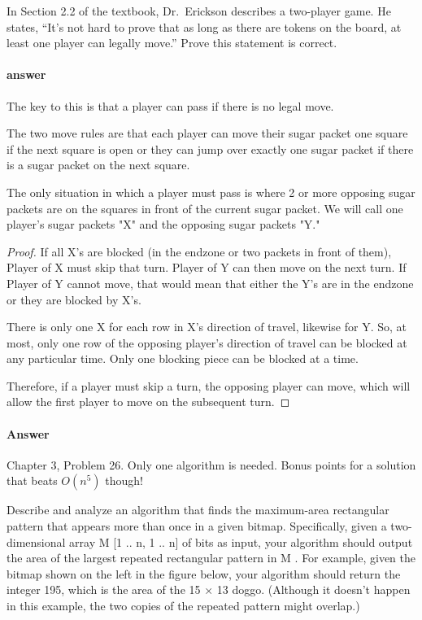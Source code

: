 \documentclass{article}
\begin{document}
In Section 2.2 of the textbook, Dr.~Erickson describes a two-player game.
He states, ``It's not hard to prove that
as long as there are tokens on the board, at least one player can legally
move.''  Prove this statement is correct.

\paragraph{answer}
The key to this is that a player can pass if there is no legal move.

The two move rules are that each player can move their sugar packet one square if the next
square is open or they can jump over exactly one sugar packet if there is a sugar packet on
the next square.

The only situation in which a player must pass is where 2 or more opposing sugar packets are on the
squares in front of the current sugar packet. We will call one player's sugar packets "X" and the opposing
sugar packets "Y."

\begin{proof}
    If all X's are blocked (in the endzone or two packets in front of them), Player of X must skip that turn.
    Player of Y can then move on the next turn. If Player of Y cannot move, that would mean that
    either the Y's are in the endzone or they are blocked by X's.

    There is only one X for each row in X's direction of travel, likewise for Y. So, at most, only
    one row of the opposing player's direction of travel can be blocked at any particular time.
    Only one blocking piece can be blocked at a time.

    Therefore, if a player must skip a turn, the opposing player can move, which will allow the first
    player to move on the subsequent turn.
\end{proof}

\paragraph{Answer}

\todo{}


\collab{}

Chapter 3, Problem 26.  Only one algorithm is needed.  Bonus points for a
solution that beats $O(n^5)$ though!

Describe and analyze an algorithm that finds the maximum-area rectangular
pattern that appears more than once in a given bitmap. Specifically, given
a two-dimensional array M [1 .. n, 1 .. n] of bits as input, your algorithm
should output the area of the largest repeated rectangular pattern in M .
For example, given the bitmap shown on the left in the figure below, your
algorithm should return the integer 195, which is the area of the 15 × 13
doggo. (Although it doesn’t happen in this example, the two copies of the
repeated pattern might overlap.)
\end{document}
